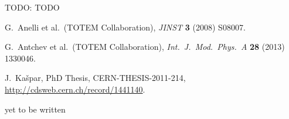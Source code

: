 \documentclass[TOTEM]{cern/cernphprep}
\def\etal{et al.}
\def\TODO#1{{\color{red}TODO: #1}}
\def\Name#1{#1, }
\def\Review#1#2#3#4{{\it #1} {\bf #2} (#3) #4}
\def\hang{\hangindent=\parindent}
\def\>{\par\vskip\itskip\parindent\itindent\indent\hang\llap{\hbox to3mm{$\bullet$\hss}}}
\def\>E{\par\vskip\itskip\parindent\itindent\indent\hang\llap{\hbox to3mm{\hss}}}
\def\>>{\par\vskip\iitskip\parindent\iitindent\indent\hang\llap{\hbox to\iitindent{\hss--\ }}}
\begin{document}
\> \TODO{TODO}


\begin{thebibliography}{99}

	\Name{G.~Anelli \etal{}~(TOTEM Collaboration)}
	\Review{JINST}{3}{2008}{S08007}.

	\Name{G.~Antchev \etal{}~(TOTEM Collaboration)}
	\Review{Int.~J.~Mod.~Phys.~A}{28}{2013}{1330046}.

	\Name{J.~Ka\v spar}
	PhD Thesis, CERN-THESIS-2011-214,
	\url{http://cdsweb.cern.ch/record/1441140}.

	yet to be written

\end{thebibliography}
\end{document}
